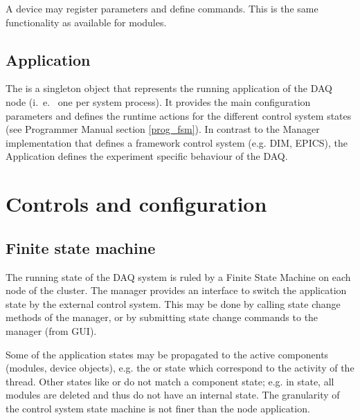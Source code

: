 A device may register parameters and define 
commands. This is the same functionality as available for modules.   


\subsection{Application}
The  
is a singleton object that represents the running application of the DAQ node 
(i.~e.~ one per system process). It provides the main configuration parameters
and defines the runtime actions for the different control system states (see Programmer Manual section \ref{prog_fsm}).
In contrast to the Manager implementation that defines a framework control system (e.g. DIM, EPICS), the Application defines the experiment specific behaviour of the DAQ.

\section{Controls and configuration}
\subsection{Finite state machine}

The running state of the DAQ system is ruled by a Finite State Machine 
\cite{Wikipedia-Statemachine} 
on  each node of the cluster. The manager provides an interface to switch the application 
state by the external control system. This may be done by calling 
state change methods of the manager, or by submitting state change commands 
to the manager (from GUI).

Some of the application states may be propagated to the 
active components (modules, device objects), e.g. the 
 or  state which correspond to the activity of the thread. 
Other states like  or  do not match a component state; 
e.g. in  state, all modules are deleted and thus do not 
have an internal state. The granularity of the control system state 
machine is not finer than the node application.


